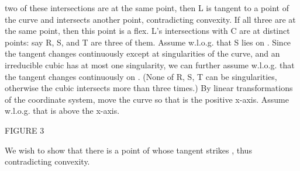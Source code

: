 two of these intersections are at the same point, then L is tangent 
to a point of the curve and intersects another point, contradicting convexity.
If all three are at the same point, then this point is a flex.
\hence L's intersections with C are at distinct points: say R, S, and T
are three of them.
Assume w.l.o.g. that S lies on .  Since the tangent changes
continuously except at singularities of the curve, and an irreducible
cubic has at most
one singularity, we can further assume w.l.o.g. that the tangent changes
continuously on . (None of R, S, T can be singularities,
otherwise the cubic intersects  more than three times.)
By linear transformations of the coordinate system, move the curve so that 
 is the positive x-axis.  Assume w.l.o.g. that  is above the
x-axis.
\begin{center}
FIGURE 3
\end{center}
We wish to show that there is a point of 
 whose tangent strikes ,
thus contradicting convexity.

